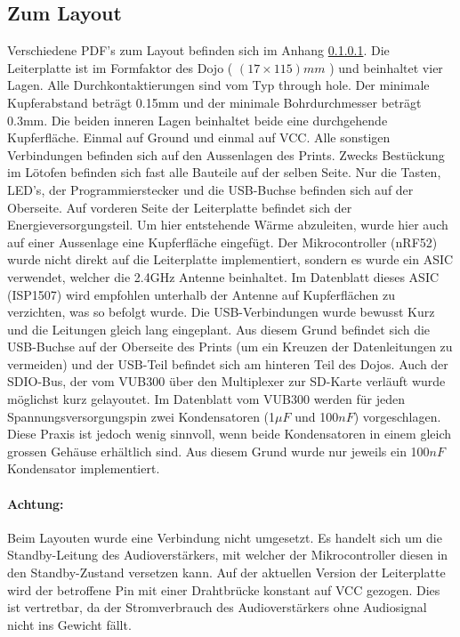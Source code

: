 \newpage

\subsection{Zum Layout}
    Verschiedene PDF's zum Layout befinden sich im Anhang \ref{}.
    Die Leiterplatte ist im Formfaktor des Dojo ( \( (17\times 115)mm \) ) und beinhaltet vier Lagen. 
    Alle Durchkontaktierungen sind vom Typ through hole. 
    Der minimale Kupferabstand beträgt 0.15mm und der minimale Bohrdurchmesser beträgt 0.3mm.
    Die beiden inneren Lagen beinhaltet beide eine durchgehende Kupferfläche. 
    Einmal auf Ground und einmal auf VCC.
    Alle sonstigen Verbindungen befinden sich auf den Aussenlagen des Prints.
    Zwecks Bestückung im Lötofen befinden sich fast alle Bauteile auf der selben Seite. 
    Nur die Tasten, LED's, der Programmierstecker und die USB-Buchse befinden sich auf der Oberseite.
    Auf vorderen Seite der Leiterplatte befindet sich der Energieversorgungsteil. 
    Um hier entstehende Wärme abzuleiten, wurde hier auch auf einer Aussenlage eine Kupferfläche eingefügt.
    Der Mikrocontroller (nRF52) wurde nicht direkt auf die Leiterplatte implementiert, sondern es wurde ein ASIC verwendet, welcher die 2.4GHz Antenne beinhaltet.
    Im Datenblatt dieses ASIC (ISP1507) wird empfohlen unterhalb der Antenne auf Kupferflächen zu verzichten, was so befolgt wurde.
    Die USB-Verbindungen wurde bewusst Kurz und die Leitungen gleich lang eingeplant. 
    Aus diesem Grund befindet sich die USB-Buchse auf der Oberseite des Prints (um ein Kreuzen der Datenleitungen zu vermeiden) und der USB-Teil befindet sich am hinteren Teil des Dojos.
    Auch der SDIO-Bus, der vom VUB300 über den Multiplexer zur SD-Karte verläuft wurde möglichst kurz gelayoutet. 
    Im Datenblatt vom VUB300 werden für jeden Spannungsversorgungspin zwei Kondensatoren (1\(\mu F\) und 100\(nF\)) vorgeschlagen. 
    Diese Praxis ist jedoch wenig sinnvoll, wenn beide Kondensatoren in einem gleich grossen Gehäuse erhältlich sind.
    Aus diesem Grund wurde nur jeweils ein 100\(nF\) Kondensator implementiert. 
    
    \vspace{0.2cm}
    
    \paragraph{Achtung:} Beim Layouten wurde eine Verbindung nicht umgesetzt. Es handelt sich um die Standby-Leitung des Audioverstärkers, mit welcher der Mikrocontroller diesen in den Standby-Zustand versetzen kann.
    Auf der aktuellen Version der Leiterplatte wird der betroffene Pin mit einer Drahtbrücke konstant auf VCC gezogen. 
    Dies ist vertretbar, da der Stromverbrauch des Audioverstärkers ohne Audiosignal nicht ins Gewicht fällt.
    
    
\newpage
  